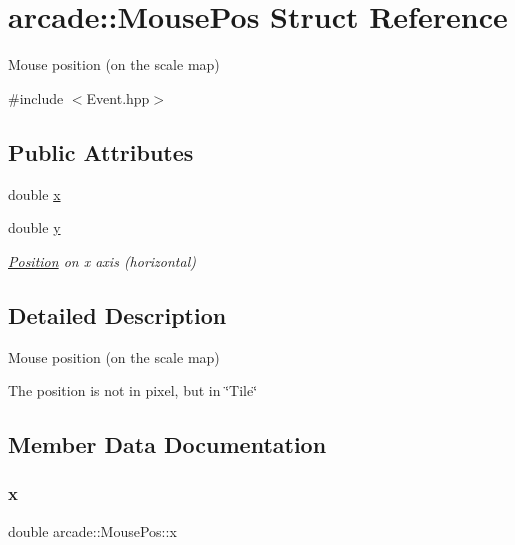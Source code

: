 \hypertarget{structarcade_1_1_mouse_pos}{}\section{arcade\+:\+:Mouse\+Pos Struct Reference}
\label{structarcade_1_1_mouse_pos}


Mouse position (on the scale map)  




{\ttfamily \#include $<$Event.\+hpp$>$}

\subsection*{Public Attributes}
\begin{DoxyCompactItemize}
\item 
double \hyperlink{structarcade_1_1_mouse_pos_a0baa5eab2ede9028abdfa46dfbf3b901}{x}
\item 
double \hyperlink{structarcade_1_1_mouse_pos_a6737b813beae9a70aa6f7cbfc90154a6}{y}
\begin{DoxyCompactList}\small\item\em \hyperlink{structarcade_1_1_position}{Position} on x axis (horizontal) \end{DoxyCompactList}\end{DoxyCompactItemize}


\subsection{Detailed Description}
Mouse position (on the scale map) 

The position is not in pixel, but in \char`\"{}\+Tile\char`\"{} 

\subsection{Member Data Documentation}
\mbox{\label{structarcade_1_1_mouse_pos_a0baa5eab2ede9028abdfa46dfbf3b901}} 
\subsubsection{\texorpdfstring{x}{x}}
{\footnotesize\ttfamily double arcade\+::\+Mouse\+Pos\+::x}

